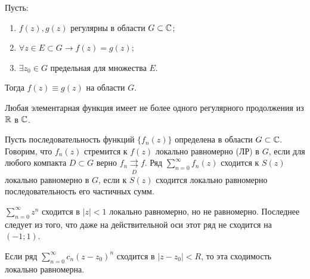 \begin{corollary}
    Пусть:
    \begin{enumerate}[wide=20pt, label=\arabic*., itemsep=0ex]
        \item \(f(z), g(z)\) регулярны в области \(G \subset \mathbb{C}\);
        \item \(\forall z \in E \subset G \rightarrow f(z) = g(z)\);
        \item \(\exists z_0 \in G\) предельная для множества \(E\).
    \end{enumerate}
    Тогда \(f(z) \equiv g(z)\) на области \(G\).
\end{corollary}

\begin{corollary}
    Любая элементарная функция имеет не более одного регулярного продолжения из \(\mathbb{R}\) в \(\mathbb{C}\).
\end{corollary}



\begin{definition}
    Пусть последовательность функций \(\{f_n(z)\}\) определена в области \(G \subset \mathbb{C}\). Говорим,
    что \(f_n(z)\) стремится к \(f(z)\) локально равномерно (ЛР) в \(G\), если для любого компакта
    \(D \subset G\) верно \(f_n \mathrel{\mathop{\rightrightarrows}\limits_{D}} f\). Ряд
    \(\sum\limits_{n=0}^\infty f_n(z)\) сходится к \(S(z)\) локально равномерно в \(G\), если к
    \(S(z)\) сходится локально равномерно последовательность его частичных сумм.
\end{definition}

\begin{example}
    \(\sum\limits_{n = 0}^\infty z^n\) сходится в \(|z| < 1\) локально равномерно, но не равномерно.
    Последнее следует из того, что даже на действительной оси этот ряд не сходится на \((-1; 1)\).
\end{example}

\begin{note}
    Если ряд \(\sum\limits_{n = 0}^\infty c_n(z-z_0)^n\) сходится в \(|z-z_0| < R\), то эта
    сходимость локально равномерна.
\end{note}

